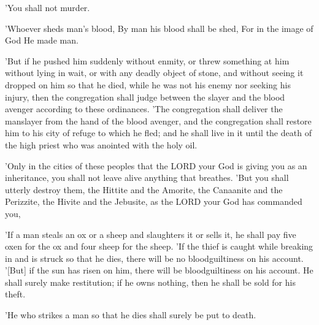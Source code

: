 \begin{scripture}[Exodus 20:13]
    'You shall not murder.
\end{scripture}

\begin{scripture}[Genesis 9:6]
    'Whoever sheds man's blood, By man his blood shall be shed, For in the image of God He made man.
\end{scripture}

\begin{scripture}[Numbers 35:22-25]
    'But if he pushed him suddenly without enmity, or threw something at him without lying in wait,
    or with any deadly object of stone, and without seeing it dropped on him so that he died, while he was not his enemy nor seeking his injury,
    then the congregation shall judge between the slayer and the blood avenger according to these ordinances.
    'The congregation shall deliver the manslayer from the hand of the blood avenger, and the congregation shall restore him to his city of refuge to which he fled; and he shall live in it until the death of the high priest who was anointed with the holy oil.
\end{scripture}

\begin{scripture}[Deuteronomy 20:16-17]
    'Only in the cities of these peoples that the LORD your God is giving you as an inheritance, you shall not leave alive anything that breathes.
    'But you shall utterly destroy them, the Hittite and the Amorite, the Canaanite and the Perizzite, the Hivite and the Jebusite, as the LORD your God has commanded you,
\end{scripture}

\begin{scripture}[Exodus 22:1-3]
    'If a man steals an ox or a sheep and slaughters it or sells it, he shall pay five oxen for the ox and four sheep for the sheep.
    'If the thief is caught while breaking in and is struck so that he dies, there will be no bloodguiltiness on his account.
    '[But] if the sun has risen on him, there will be bloodguiltiness on his account. He shall surely make restitution; if he owns nothing, then he shall be sold for his theft.
\end{scripture}

\begin{scripture}[Exodus 21:12]
    'He who strikes a man so that he dies shall surely be put to death.
\end{scripture}

